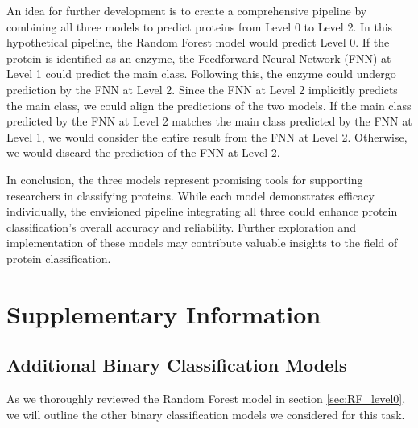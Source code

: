 \documentclass{bioinfo}
\begin{document}
An idea for further development is to create a comprehensive pipeline by combining all three models to predict proteins from Level 0 to Level 2.
In this hypothetical pipeline, the Random Forest model would predict Level 0.
If the protein is identified as an enzyme, the Feedforward Neural Network (FNN) at Level 1 could predict the main class.
Following this, the enzyme could undergo prediction by the FNN at Level 2.
Since the FNN at Level 2 implicitly predicts the main class, we could align the predictions of the two models.
If the main class predicted by the FNN at Level 2 matches the main class predicted by the FNN at Level 1, 
we would consider the entire result from the FNN at Level 2.
Otherwise, we would discard the prediction of the FNN at Level 2.

In conclusion, the three models represent promising tools for supporting researchers in classifying proteins. 
While each model demonstrates efficacy individually, the envisioned pipeline integrating all three could enhance protein classification's overall accuracy and reliability.
Further exploration and implementation of these models may contribute valuable insights to the field of protein classification.

\section{Supplementary Information}

\subsection{Additional Binary Classification Models}\label{sec:unused binarys}
As we thoroughly reviewed the Random Forest model in section \ref{sec:RF_level0}, we will outline the other binary classification models we considered for this task.
\end{document}
